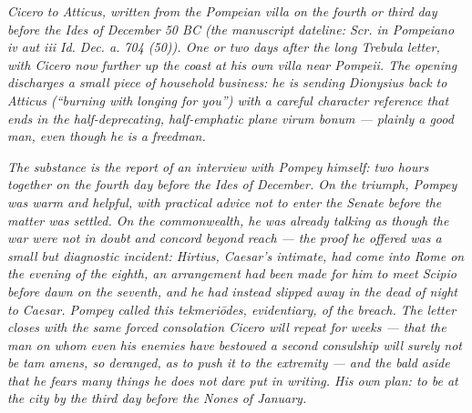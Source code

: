 
\textit{Cicero to Atticus, written from the Pompeian villa on
the fourth or third day before the Ides of December 50 BC
(the manuscript dateline: \textit{Scr. in Pompeiano iv aut iii
Id. Dec. a. 704 (50)}). One or two days after the long Trebula
letter, with Cicero now further up the coast at his own villa
near Pompeii. The opening discharges a small piece of
household business: he is sending Dionysius back to Atticus
(``burning with longing for you'') with a careful character
reference that ends in the half-deprecating, half-emphatic
\emph{plane virum bonum} --- plainly a good man, even though
he is a freedman.}

\textit{The substance is the report of an interview with
Pompey himself: two hours together on the fourth day before
the Ides of December. On the triumph, Pompey was warm and
helpful, with practical advice not to enter the Senate before
the matter was settled. On the commonwealth, he was already
talking as though the war were not in doubt and concord
beyond reach --- the proof he offered was a small but
diagnostic incident: Hirtius, Caesar's intimate, had come
into Rome on the evening of the eighth, an arrangement had
been made for him to meet Scipio before dawn on the seventh,
and he had instead slipped away in the dead of night to
Caesar. Pompey called this \emph{tekmeriōdes}, evidentiary,
of the breach. The letter closes with the same forced
consolation Cicero will repeat for weeks --- that the man on
whom even his enemies have bestowed a second consulship will
surely not be \emph{tam amens}, so deranged, as to push it
to the extremity --- and the bald aside that he fears many
things he does not dare put in writing. His own plan: to be
at the city by the third day before the Nones of January.}
